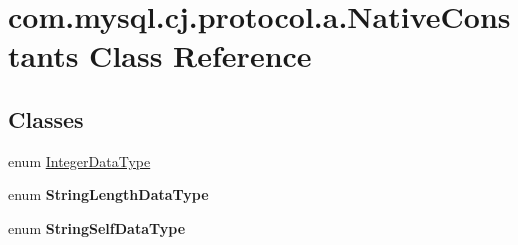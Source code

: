 \hypertarget{classcom_1_1mysql_1_1cj_1_1protocol_1_1a_1_1_native_constants}{}\section{com.\+mysql.\+cj.\+protocol.\+a.\+Native\+Constants Class Reference}
\label{classcom_1_1mysql_1_1cj_1_1protocol_1_1a_1_1_native_constants}
\subsection*{Classes}
\begin{DoxyCompactItemize}
\item 
enum \mbox{\hyperlink{enumcom_1_1mysql_1_1cj_1_1protocol_1_1a_1_1_native_constants_1_1_integer_data_type}{Integer\+Data\+Type}}
\item 
enum {\bfseries String\+Length\+Data\+Type}
\item 
enum {\bfseries String\+Self\+Data\+Type}
\end{DoxyCompactItemize}
